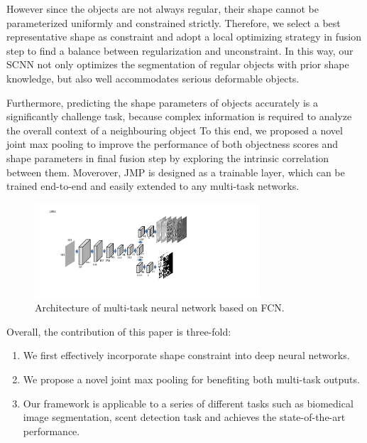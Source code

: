 However since the objects are not always regular, their shape cannot be parameterized uniformly and constrained strictly.
Therefore, we select a best representative shape as constraint and adopt a local optimizing strategy in fusion step to find a balance between regularization and unconstraint.
In this way, our SCNN not only optimizes the segmentation of regular objects with prior shape knowledge, but also well accommodates serious deformable objects.

Furthermore, predicting the shape parameters of objects accurately is a significantly challenge task, because complex information is required to analyze the overall context of a neighbouring object
To this end, we proposed a novel joint max pooling to improve the performance of both objectness scores and shape parameters in final fusion step by exploring the intrinsic correlation between them.
Moverover, JMP is designed as a trainable layer, which can be trained end-to-end and easily extended to any multi-task networks.

\begin{figure}
    \begin{center}
        \includegraphics[width=3.3in]{figures/FigMTN.pdf}
    \end{center}
    \caption{Architecture of multi-task neural network based on FCN. }
    \label{FigMTN}
\end{figure}
Overall, the contribution of this paper is three-fold:
\begin{enumerate}
	\item We first effectively incorporate shape constraint into deep neural networks.
	\item We propose a novel joint max pooling for benefiting both multi-task outputs.
	\item Our framework is applicable to a series of different tasks such as biomedical image segmentation, scent detection task and achieves the state-of-the-art performance.
\end{enumerate}
